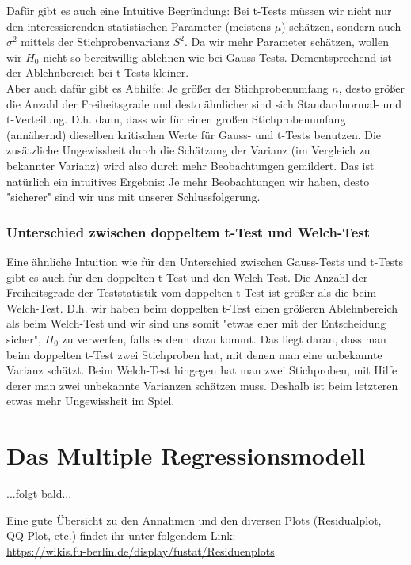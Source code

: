 \documentclass[a4paper]{article}
\begin{document}
\noindent Dafür gibt es auch eine Intuitive Begründung: Bei t-Tests müssen wir nicht nur den interessierenden statistischen Parameter (meistens $\mu$) schätzen, sondern auch $\sigma^2$ mittels der Stichprobenvarianz $S^2$. Da wir mehr Parameter schätzen, wollen wir $H_0$ nicht so bereitwillig ablehnen wie bei Gauss-Tests. Dementsprechend ist der Ablehnbereich bei t-Tests kleiner. \\

\noindent Aber auch dafür gibt es Abhilfe: Je größer der Stichprobenumfang $n$, desto größer die Anzahl der Freiheitsgrade und desto ähnlicher sind sich Standardnormal- und t-Verteilung. D.h. dann, dass wir für einen großen Stichprobenumfang (annähernd) dieselben kritischen Werte für Gauss- und t-Tests benutzen. Die zusätzliche Ungewissheit durch die Schätzung der Varianz (im Vergleich zu bekannter Varianz) wird also durch mehr Beobachtungen gemildert. Das ist natürlich ein intuitives Ergebnis: Je mehr Beobachtungen wir haben, desto "sicherer" sind wir uns mit unserer Schlussfolgerung.

\subsubsection{Unterschied zwischen doppeltem t-Test und Welch-Test}\label{sec:t2vsWelch}
Eine ähnliche Intuition wie für den Unterschied zwischen Gauss-Tests und t-Tests gibt es auch für den doppelten t-Test und den Welch-Test. Die Anzahl der Freiheitsgrade der Teststatistik vom doppelten t-Test ist größer als die beim Welch-Test. D.h. wir haben beim doppelten t-Test einen größeren Ablehnbereich als beim Welch-Test und wir sind uns somit "etwas eher mit der Entscheidung sicher", $H_0$ zu verwerfen, falls es denn dazu kommt. Das liegt daran, dass man beim doppelten t-Test zwei Stichproben hat, mit denen man eine unbekannte Varianz schätzt. Beim Welch-Test hingegen hat man zwei Stichproben, mit Hilfe derer man zwei unbekannte Varianzen schätzen muss. Deshalb ist beim letzteren etwas mehr Ungewissheit im Spiel.

\newpage
\section{Das Multiple Regressionsmodell}\label{sec:Reg}

...folgt bald...

\noindent Eine gute Übersicht zu den Annahmen und den diversen Plots (Residualplot, QQ-Plot, etc.) findet ihr unter folgendem Link:\\
\url{https://wikis.fu-berlin.de/display/fustat/Residuenplots}
\end{document}
